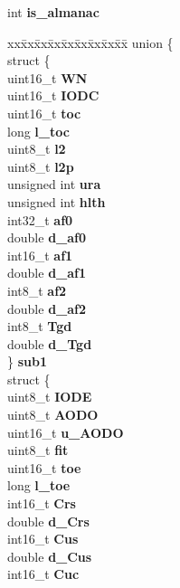 \begin{DoxyCompactItemize}
\item 
\hypertarget{structsubframe__t_ac1d37cd016692127ed20e5f955146d7e}{int {\bfseries is\-\_\-almanac}}\label{structsubframe__t_ac1d37cd016692127ed20e5f955146d7e}

\item 
\hypertarget{structsubframe__t_a50c941ce5022c584586162bb5d535d94}{\begin{tabbing}
xx\=xx\=xx\=xx\=xx\=xx\=xx\=xx\=xx\=\kill
union \{\\
\>struct \{\\
\>\>uint16\_t {\bfseries WN}\\
\>\>uint16\_t {\bfseries IODC}\\
\>\>uint16\_t {\bfseries toc}\\
\>\>long {\bfseries l\_toc}\\
\>\>uint8\_t {\bfseries l2}\\
\>\>uint8\_t {\bfseries l2p}\\
\>\>unsigned int {\bfseries ura}\\
\>\>unsigned int {\bfseries hlth}\\
\>\>int32\_t {\bfseries af0}\\
\>\>double {\bfseries d\_af0}\\
\>\>int16\_t {\bfseries af1}\\
\>\>double {\bfseries d\_af1}\\
\>\>int8\_t {\bfseries af2}\\
\>\>double {\bfseries d\_af2}\\
\>\>int8\_t {\bfseries Tgd}\\
\>\>double {\bfseries d\_Tgd}\\
\>\} {\bfseries sub1}\\
\>struct \{\\
\>\>uint8\_t {\bfseries IODE}\\
\>\>uint8\_t {\bfseries AODO}\\
\>\>uint16\_t {\bfseries u\_AODO}\\
\>\>uint8\_t {\bfseries fit}\\
\>\>uint16\_t {\bfseries toe}\\
\>\>long {\bfseries l\_toe}\\
\>\>int16\_t {\bfseries Crs}\\
\>\>double {\bfseries d\_Crs}\\
\>\>int16\_t {\bfseries Cus}\\
\>\>double {\bfseries d\_Cus}\\
\>\>int16\_t {\bfseries Cuc}\\

\end{tabbing}}
\end{DoxyCompactItemize}
